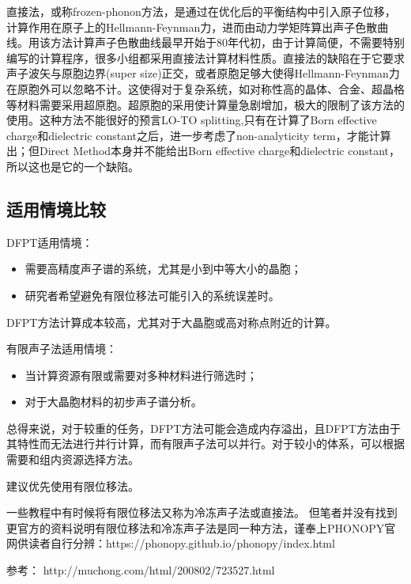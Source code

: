 \begin{extend}
    直接法，或称frozen-phonon方法，是通过在优化后的平衡结构中引入原子位移，计算作用在原子上的Hellmann-Feynman力，进而由动力学矩阵算出声子色散曲线。用该方法计算声子色散曲线最早开始于80年代初，由于计算简便，不需要特别编写的计算程序，很多小组都采用直接法计算材料性质。直接法的缺陷在于它要求声子波矢与原胞边界(super size)正交，或者原胞足够大使得Hellmann-Feynman力在原胞外可以忽略不计。这使得对于复杂系统，如对称性高的晶体、合金、超晶格等材料需要采用超原胞。超原胞的采用使计算量急剧增加，极大的限制了该方法的使用。这种方法不能很好的预言LO-TO splitting,只有在计算了Born effective charge和dielectric constant之后，进一步考虑了non-analyticity term，才能计算出；但Direct Method本身并不能给出Born effective charge和dielectric constant，所以这也是它的一个缺陷。
\end{extend}

\subsection{适用情境比较}\label{sec:计算方法简介-适用情境比较}

DFPT适用情境：
\begin{itemize}
    \item 需要高精度声子谱的系统，尤其是小到中等大小的晶胞；
    \item 研究者希望避免有限位移法可能引入的系统误差时。
\end{itemize}
\begin{attention}
    DFPT方法计算成本较高，尤其对于大晶胞或高对称点附近的计算。
\end{attention}

有限声子法适用情境：
\begin{itemize}
    \item 当计算资源有限或需要对多种材料进行筛选时；
    \item 对于大晶胞材料的初步声子谱分析。
\end{itemize}

总得来说，对于较重的任务，DFPT方法可能会造成内存溢出，且DFPT方法由于其特性而无法进行并行计算，而有限声子法可以并行。对于较小的体系，可以根据需要和组内资源选择方法。

\begin{extend}
  建议优先使用有限位移法。
\end{extend}

\begin{extend}
    一些教程中有时候将有限位移法又称为冷冻声子法或直接法。
    但笔者并没有找到更官方的资料说明有限位移法和冷冻声子法是同一种方法，谨奉上PHONOPY官网供读者自行分辨：https://phonopy.github.io/phonopy/index.html
\end{extend}

参考：
http://muchong.com/html/200802/723527.html